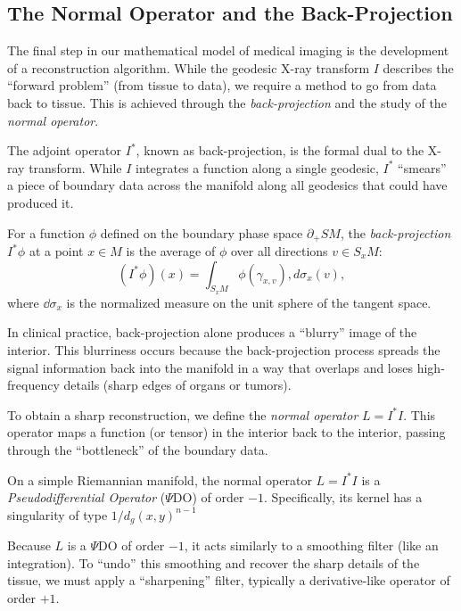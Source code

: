 \subsection{The Normal Operator and the Back-Projection}
\label{sub_sec:the_normal_operator_and_the_back_projection}

The final step in our mathematical model of medical imaging is the development of a reconstruction algorithm. While the geodesic X-ray transform $I$ describes the ``forward problem'' (from tissue to data), we require a method to go from data back to tissue. This is achieved through the \emph{back-projection} and the study of the \emph{normal operator}.

The adjoint operator $I^*$, known as back-projection, is the formal dual to the X-ray transform. While $I$ integrates a function along a single geodesic, $I^*$ ``smears'' a piece of boundary data across the manifold along all geodesics that could have produced it.

\begin{definition}
  For a function $\phi$ defined on the boundary phase space $\partial_+ SM$, the \emph{back-projection} $I^*\phi$ at a point $x \in M$ is the average of $\phi$ over all directions $v \in S_x M$:
  \[%
    (I^*\phi)(x) = \int_{S_x M} \phi(\gamma_{x,v}) , d\sigma_x(v)
  ,\]%
  where $\dd{\sigma}_x$ is the normalized measure on the unit sphere of the tangent space.
\end{definition}

In clinical practice, back-projection alone produces a ``blurry'' image of the interior. This blurriness occurs because the back-projection process spreads the signal information back into the manifold in a way that overlaps and loses high-frequency details (sharp edges of organs or tumors).

To obtain a sharp reconstruction, we define the \emph{normal operator} $L = I^* I$. This operator maps a function (or tensor) in the interior back to the interior, passing through the ``bottleneck'' of the boundary data.

\begin{proposition}
  On a simple Riemannian manifold, the normal operator $L = I^* I$ is a \emph{Pseudodifferential Operator} ($\Psi$DO) of order $-1$. Specifically, its kernel has a singularity of type $1/d_g(x, y)^{n-1}$
\end{proposition}

Because $L$ is a $\Psi$DO of order $-1$, it acts similarly to a smoothing filter (like an integration). To ``undo'' this smoothing and recover the sharp details of the tissue, we must apply a ``sharpening'' filter, typically a derivative-like operator of order $+1$.

